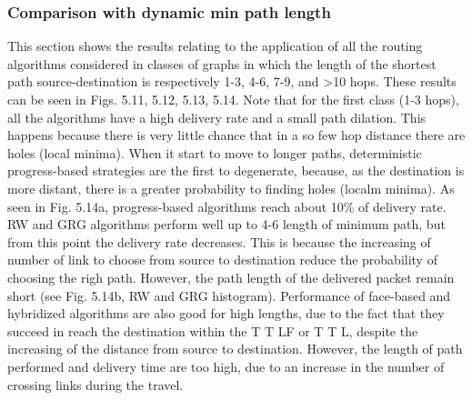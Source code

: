 \documentclass[journal,comsoc]{IEEEtran}
\begin{document}
\subsubsection{Comparison with dynamic min path length}
This section shows the results relating to the application of all the routing algorithms
considered in classes of graphs in which the length of the shortest path source-destination
is respectively 1-3, 4-6, 7-9, and >10 hops. These results can be seen in Figs. 5.11,
5.12, 5.13, 5.14. Note that for the first class (1-3 hops), all the algorithms have a
high delivery rate and a small path dilation. This happens because there is very little
chance that in a so few hop distance there are holes (local minima).
When it start to move to longer paths, deterministic progress-based strategies are
the first to degenerate, because, as the destination is more distant, there is a greater
probability to finding holes (localm minima). As seen in Fig. 5.14a, progress-based
algorithms reach about 10\% of delivery rate.
RW and GRG algorithms perform well up to 4-6 length of minimum path, but
from this point the delivery rate decreases. This is because the increasing of number of
link to choose from source to destination reduce the probability of choosing the righ path. However, the path length of the delivered packet remain short (see Fig. 5.14b,
RW and GRG histogram).
Performance of face-based and hybridized algorithms are also good for high lengths,
due to the fact that they succeed in reach the destination within the T T LF or T T L,
despite the increasing of the distance from source to destination. However, the length
of path performed and delivery time are too high, due to an increase in the number of
crossing links during the travel. \cite{IEEEhowto:kopka}
\end{document}
